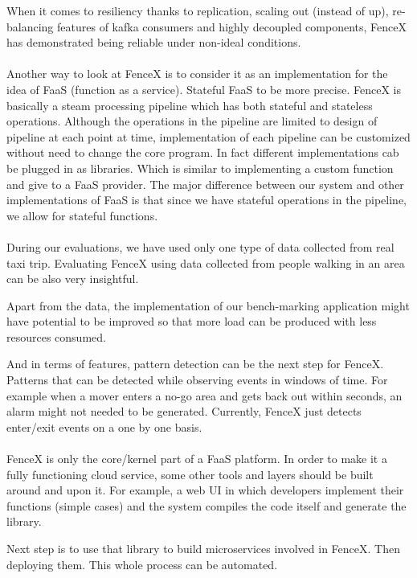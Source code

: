 \documentclass[a4]{report}
\begin{document}
    When it comes to resiliency thanks to replication, scaling out (instead of up), re-balancing features of kafka
    consumers and highly decoupled components, FenceX has demonstrated being reliable under non-ideal conditions.

    \paragraph{}
    Another way to look at FenceX is to consider it as an implementation for the idea of FaaS (function as a service).
    Stateful FaaS to be more precise.
    FenceX is basically a steam processing pipeline which has both stateful and stateless operations.
    Although the operations in the pipeline are limited to design of pipeline at each point at time, implementation
    of each pipeline can be customized without need to change the core program.
    In fact different implementations cab be plugged in as libraries.
    Which is similar to implementing a custom function and give to a FaaS provider.
    The major difference between our system and other implementations of FaaS is that since we have stateful
    operations in the pipeline, we allow for stateful functions.

    \paragraph{}
    During our evaluations, we have used only one type of data collected from real taxi trip.
    Evaluating FenceX using data collected from people walking in an area can be also very insightful.

    Apart from the data, the implementation of our bench-marking application might have potential to be improved so
    that more load can be produced with less resources consumed.

    And in terms of features, pattern detection can be the next step for FenceX.
    Patterns that can be detected while observing events in windows of time.
    For example when a mover enters a no-go area and gets back out within seconds, an alarm might not needed to be
    generated.
    Currently, FenceX just detects enter/exit events on a one by one basis.

    \paragraph{}
    FenceX is only the core/kernel part of a FaaS platform.
    In order to make it a fully functioning cloud service, some other tools and layers should be built around and
    upon it.
    For example, a web UI in which developers implement their functions (simple cases) and the system compiles
    the code itself and generate the library.

    Next step is to use that library to build microservices involved in FenceX.
    Then deploying them.
    This whole process can be automated.

    \nocite{*}
    
    
\end{document}
